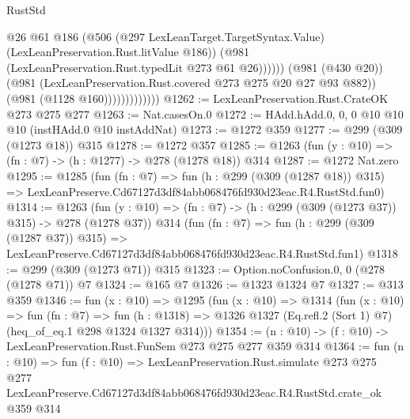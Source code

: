 \begin{lexlean}{RustStd}
\begin{coremodule}
                                  @26
                                  @61
                                  @186
                                  (@506
                                    (@297 LexLeanTarget.TargetSyntax.Value)
                                    (LexLeanPreservation.Rust.litValue @186))
                                  (@981 (LexLeanPreservation.Rust.typedLit @273 @61 @26))))))
                          (@981 (@430 @20))
                          (@981 (LexLeanPreservation.Rust.covered @273 @275 @20 @27 @93 @882))
                          (@981 (@1128 @160)))))))))))))
@1262 := LexLeanPreservation.Rust.CrateOK @273 @275 @277
@1263 := Nat.casesOn.{0}
@1272 := HAdd.hAdd.{0, 0, 0} @10 @10 @10 (instHAdd.{0} @10 instAddNat)
@1273 := @1272 @359
@1277 := @299 (@309 (@1273 @18)) @315
@1278 := @1272 @357
@1285 := @1263 (fun (y : @10) => (fn : @7) -> (h : @1277) -> @278 (@1278 @18)) @314
@1287 := @1272 Nat.zero
@1295 := @1285
    (fun (fn : @7) =>
    fun (h : @299 (@309 (@1287 @18)) @315) =>
    LexLeanPreserve.Cd67127d3df84abb068476fd930d23eac.R4.RustStd.fun0)
@1314 := @1263
    (fun (y : @10) => (fn : @7) -> (h : @299 (@309 (@1273 @37)) @315) -> @278 (@1278 @37))
    @314
    (fun (fn : @7) =>
    fun (h : @299 (@309 (@1287 @37)) @315) =>
    LexLeanPreserve.Cd67127d3df84abb068476fd930d23eac.R4.RustStd.fun1)
@1318 := @299 (@309 (@1273 @71)) @315
@1323 := Option.noConfusion.{0, 0} (@278 (@1278 @71)) @7
@1324 := @165 @7
@1326 := @1323 @1324 @7
@1327 := @313 @359
@1346 := fun (x : @10) =>
  @1295
    (fun (x : @10) =>
    @1314
      (fun (x : @10) =>
      fun (fn : @7) =>
      fun (h : @1318) =>
      @1326 @1327 (Eq.refl.{2} (Sort 1) @7) (heq_of_eq.{1} @298 @1324 @1327 @314)))
@1354 := (n : @10) -> (f : @10) -> LexLeanPreservation.Rust.FunSem @273 @275 @277 @359 @314
@1364 := fun (n : @10) =>
  fun (f : @10) =>
  LexLeanPreservation.Rust.simulate
    @273
    @275
    @277
    LexLeanPreserve.Cd67127d3df84abb068476fd930d23eac.R4.RustStd.crate_ok
    @359
    @314
\end{coremodule}
\end{lexlean}
